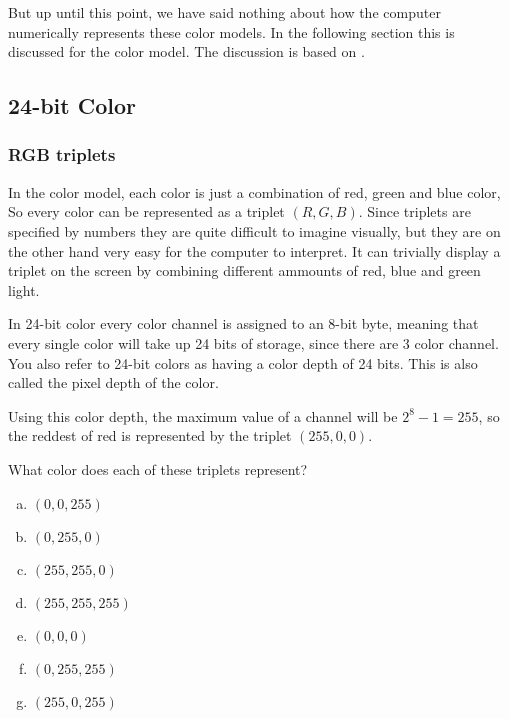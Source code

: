 But up until this point, we have said nothing about how the computer
numerically represents these color models. In the following section
this is discussed for the \rgb color model. The discussion is based on
\cite{murray1996encyclopedia,neider93:_openg_progr_guide,niederst1999webdesign,sitts2000handbook}.

\subsection{24-bit Color}
\label{sec:24-bit-color}

\subsubsection{RGB triplets}


In the \rgb color model, each color is just a combination of red,
green and blue color, So every color can be represented as a triplet
$(R, G, B)$. Since triplets are specified by numbers they are quite
difficult to imagine visually, but they are on the other hand very
easy for the computer to interpret. It can trivially display a triplet
on the screen by combining different ammounts of red, blue and green
light.

In 24-bit color every color channel is assigned to an 8-bit byte,
meaning that every single color will take up 24 bits of storage, since
there are $3$ color channel. You also refer to 24-bit colors as having
a color depth of 24 bits. This is also called the pixel
depth of the color.

Using this color depth, the maximum value of a channel will be $2^8 -
1 = 255$, so the reddest of red is represented by the triplet
$(255,0,0)$.

\begin{Exercise}[label={rgb-triplet}]
  What color does each of these triplets represent?

  \begin{enumerate}[(a)]
  \item $(0,0,255)$
  \item $(0, 255, 0)$
  \item $(255,255,0)$
  \item $(255,255,255)$
  \item $(0,0,0)$
  \item $(0,255,255)$
  \item $(255,0,255)$

  \end{enumerate}
\end{Exercise}

